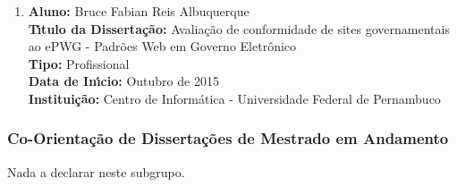 \documentclass[a4paper,oneside,10pt]{article}
\begin{document}
\begin{enumerate}
\item       \textbf{Aluno:} Bruce Fabian Reis Albuquerque \mbox{}\\
            \textbf{T\'{\i}tulo da Disserta\c{c}\~{a}o:} Avaliação de conformidade de sites governamentais ao ePWG - Padrões Web em Governo Eletrônico\\
            \textbf{Tipo:} Profissional\\
            \textbf{Data de In\'{\i}cio:} Outubro de 2015\\
            \textbf{Institui\c{c}\~{a}o:} Centro de Informática - Universidade Federal de Pernambuco
            
\end{enumerate}

\subsubsection{Co-Orienta\c{c}\~{a}o de Disserta\c{c}\~{o}es de Mestrado em Andamento}
\vspace{0.3cm}

Nada a declarar neste subgrupo.



\end{document}

